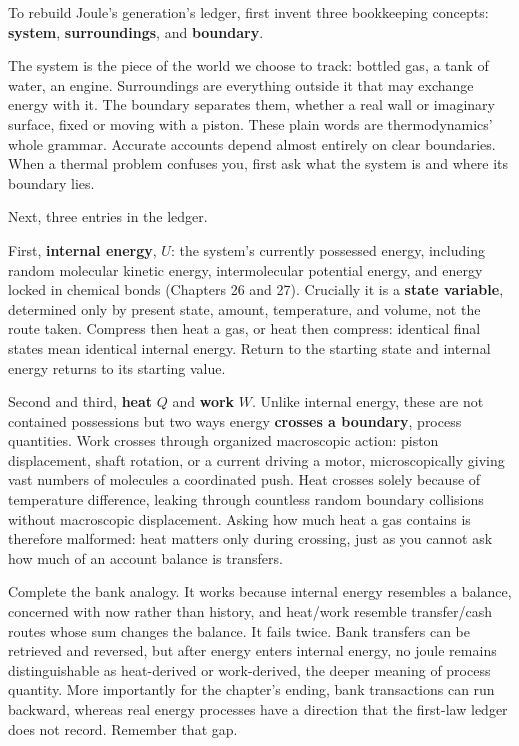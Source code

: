 
\begin{mainline}
To rebuild Joule's generation's ledger, first invent three bookkeeping concepts: \textbf{system}, \textbf{surroundings}, and \textbf{boundary}.

The system is the piece of the world we choose to track: bottled gas, a tank of water, an engine. Surroundings are everything outside it that may exchange energy with it. The boundary separates them, whether a real wall or imaginary surface, fixed or moving with a piston. These plain words are thermodynamics' whole grammar. Accurate accounts depend almost entirely on clear boundaries. When a thermal problem confuses you, first ask what the system is and where its boundary lies.

Next, three entries in the ledger.

First, \textbf{internal energy}, \(U\): the system's currently possessed energy, including random molecular kinetic energy, intermolecular potential energy, and energy locked in chemical bonds (Chapters 26 and 27). Crucially it is a \textbf{state variable}, determined only by present state, amount, temperature, and volume, not the route taken. Compress then heat a gas, or heat then compress: identical final states mean identical internal energy. Return to the starting state and internal energy returns to its starting value.

Second and third, \textbf{heat} \(Q\) and \textbf{work} \(W\). Unlike internal energy, these are not contained possessions but two ways energy \textbf{crosses a boundary}, process quantities. Work crosses through organized macroscopic action: piston displacement, shaft rotation, or a current driving a motor, microscopically giving vast numbers of molecules a coordinated push. Heat crosses solely because of temperature difference, leaking through countless random boundary collisions without macroscopic displacement. Asking how much heat a gas contains is therefore malformed: heat matters only during crossing, just as you cannot ask how much of an account balance is transfers.

Complete the bank analogy. It works because internal energy resembles a balance, concerned with now rather than history, and heat/work resemble transfer/cash routes whose sum changes the balance. It fails twice. Bank transfers can be retrieved and reversed, but after energy enters internal energy, no joule remains distinguishable as heat-derived or work-derived, the deeper meaning of process quantity. More importantly for the chapter's ending, bank transactions can run backward, whereas real energy processes have a direction that the first-law ledger does not record. Remember that gap.


\end{mainline}
